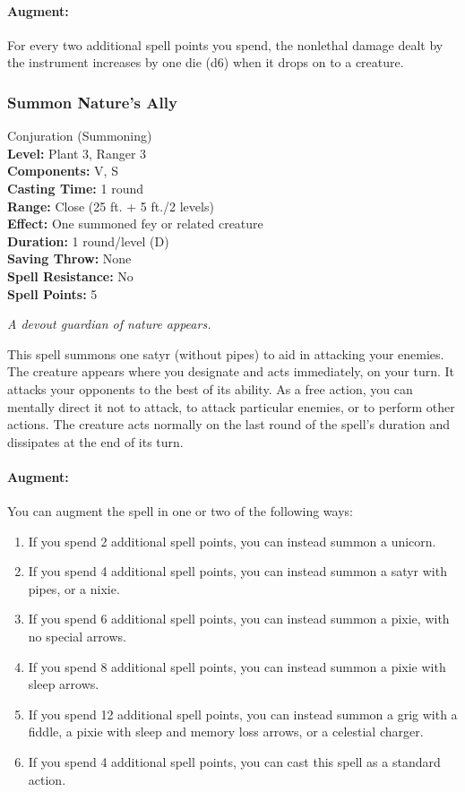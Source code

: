 \paragraph{Augment:} For every two additional spell points you spend, the nonlethal damage dealt by the instrument increases by one die (d6) when it drops on to a creature.
\subsubsection{Summon Nature's Ally}
\label{Spell:SummonNaturesAlly}
Conjuration (Summoning)
\\ \textbf{Level:} Plant 3, Ranger 3
\\ \textbf{Components:} V, S
\\ \textbf{Casting Time:} 1 round
\\ \textbf{Range:} Close (25 ft. + 5 ft./2 levels)
\\ \textbf{Effect:} One summoned fey or related creature
\\ \textbf{Duration:} 1 round/level (D)
\\ \textbf{Saving Throw:} None
\\ \textbf{Spell Resistance:} No
\\ \textbf{Spell Points:} 5

\emph{A devout guardian of nature appears.}

This spell summons one satyr (without pipes) to aid in attacking your enemies.
The creature appears where you designate and acts immediately, on your turn. 
It attacks your opponents to the best of its ability. 
As a free action, you can mentally direct it not to attack, to attack particular enemies, or to perform other actions. 
The creature acts normally on the last round of the spell's duration and dissipates at the end of its turn.

\paragraph{Augment:} You can augment the spell in one or two of the following ways: 
\begin{enumerate}
 \item If you spend 2 additional spell points, you can instead summon a unicorn.
 \item If you spend 4 additional spell points, you can instead summon a satyr with pipes, or a nixie.
 \item If you spend 6 additional spell points, you can instead summon a pixie, with no special arrows.
 \item If you spend 8 additional spell points, you can instead summon a pixie with sleep arrows.
 \item If you spend 12 additional spell points, you can instead summon a grig with a fiddle, a pixie with sleep and memory loss arrows, or a celestial charger.
 \item If you spend 4 additional spell points, you can cast this spell as a standard action.
\end{enumerate}
